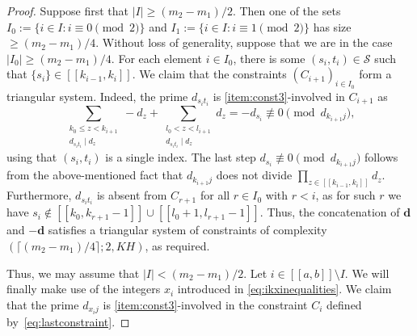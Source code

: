 \documentclass[11pt]{amsart}
\theoremstyle{definition}
\renewcommand{\leq}{\leqslant}
\renewcommand{\geq}{\geqslant}
\newcommand{\interval}[2]{[\![#1,#2]\!] }
\newcommand{\abs}[1]{\left|#1\right|}
\renewcommand{\d}{\boldsymbol{d}}
\newcommand{\pcomp}[2]{d_{#1#2}}
\newcommand{\s}{\mathcal{S}}
\newcommand{\repK}{K}
\begin{document}
\begin{proof}
Suppose first that $\abs{I}\geq (m_2-m_1)/2$. Then one of the sets $I_0 := \{i\in I : i\equiv 0\pmod 2\}$ and $I_1 := \{i\in I : i\equiv 1\pmod 2\}$ has size $\geq (m_2-m_1)/4$. Without loss of generality, suppose that we are in the case $\abs{I_0}\geq (m_2-m_1)/4$. For each element $i\in I_0$, there is some $(s_i, t_i)\in \s$ such that $\{s_i\} \in \interval{k_{i-1}}{k_i}$. We claim that the constraints $(C_{i+1})_{i\in I_0}$ form a triangular system. Indeed, the prime $\pcomp{s_i}{t_i}$ is \cref{item:const3}-involved in $C_{i+1}$ as
\begin{equation*}
	\sum_{\substack{k_0\leq z<k_{i+1}\\ \pcomp{s_i}{t_i} \mid d_z}}-d_z + \sum_{\substack{l_0< z<l_{i+1}\\ \pcomp{s_i}{t_i} \mid d_z}}d_z= -d_{s_i} \not\equiv 0 \pmod{\pcomp{k_{i+1}}{j}},
\end{equation*}
using that $(s_i, t_i)$ is a single index. The last step $d_{s_i}\not\equiv 0 \pmod{\pcomp{k_{i+1}}{j}}$ follows from the above-mentioned fact that $\pcomp{k_{i+1}}{j}$ does not divide $\prod_{z\in \interval{k_{i-1}}{k_i}} d_z$. Furthermore, $\pcomp{s_i}{t_i}$ is absent from $C_{r+1}$ for all $r\in I_0$ with $r<i$, as for such $r$ we have $s_i \not\in \interval{k_0}{k_{r+1}-1} \cup \interval{l_0+1}{l_{r+1}-1}$. Thus, the concatenation of $\d$ and $-\d$ satisfies a triangular system of constraints of complexity ${(\lceil (m_2-m_1)/4 \rceil ;2,\repK H)}$, as required.

Thus, we may assume that $\abs{I} < (m_2-m_1)/2$. Let $i\in \interval{a}{b}\setminus I$. We will finally make use of the integers $x_i$ introduced in \cref{eq:ikxinequalities}. We claim that the prime $\pcomp{x_i}{j}$ is \cref{item:const3}-involved in the constraint $C_i$ defined by~\cref{eq:lastconstraint}. 


\end{proof}
\end{document}
